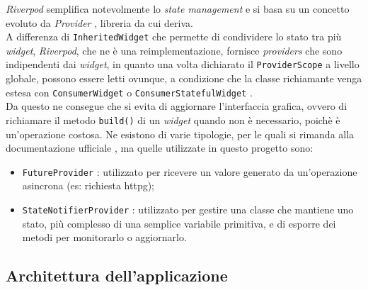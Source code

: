\emph{Riverpod} semplifica notevolmente lo \emph{state management} e si basa su un concetto evoluto da \emph{Provider} \cite{site:provider}, libreria da cui deriva.\\
A differenza di \lstinline{InheritedWidget} \cite{site:inheritw} che permette di condividere lo stato tra più \emph{widget}, \emph{Riverpod}, che ne è una reimplementazione, fornisce \emph{providers} che sono indipendenti dai \emph{widget}, in quanto una volta dichiarato il \lstinline{ProviderScope} a livello globale, possono essere letti ovunque, a condizione che la classe richiamante venga estesa con \lstinline{ConsumerWidget} o \lstinline{ConsumerStatefulWidget} \cite{site:reading-provider}. \\
Da questo ne consegue che si evita di aggiornare l'interfaccia grafica, ovvero di richiamare il metodo \lstinline{build()} di un \emph{widget} quando non è necessario, poichè è un'operazione costosa.
Ne esistono di varie tipologie, per le quali si rimanda alla documentazione ufficiale \cite{site:riverpod}, ma quelle utilizzate in questo progetto sono:
\begin{itemize}
    \item \lstinline{FutureProvider} \cite{site:future-provider}: utilizzato per ricevere un valore generato da un'operazione asincrona (es: richiesta \gls{httpg}\glsoccur);
    \item \lstinline{StateNotifierProvider} \cite{site:state-notifier-provider}: utilizzato per gestire una classe che mantiene uno stato, più complesso di una semplice variabile primitiva, e di esporre dei metodi per monitorarlo o aggiornarlo.
\end{itemize}

\subsection{Architettura dell'applicazione}
\label{subsec:architettura-app}

